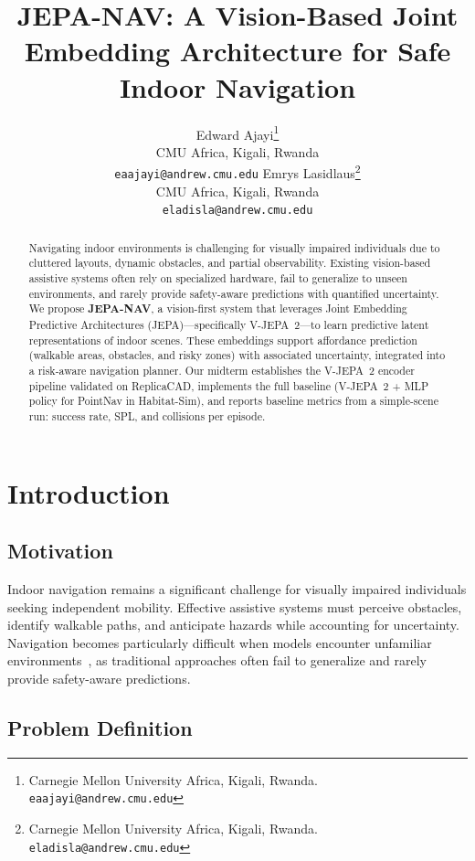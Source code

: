 \documentclass{article}
\title{JEPA-NAV: A Vision-Based Joint Embedding Architecture for Safe Indoor Navigation}
\author{
  Edward Ajayi\thanks{Carnegie Mellon University Africa, Kigali, Rwanda. \texttt{eaajayi@andrew.cmu.edu}} \\
  CMU Africa, Kigali, Rwanda \\
  \texttt{eaajayi@andrew.cmu.edu}
  \And
  Emrys Lasidlaus\thanks{Carnegie Mellon University Africa, Kigali, Rwanda. \texttt{eladisla@andrew.cmu.edu}} \\
  CMU Africa, Kigali, Rwanda \\
  \texttt{eladisla@andrew.cmu.edu}
}
\begin{document}
\maketitle

\begin{abstract}
Navigating indoor environments is challenging for visually impaired individuals due to
cluttered layouts, dynamic obstacles, and partial observability. Existing vision-based
assistive systems often rely on specialized hardware, fail to generalize to unseen
environments, and rarely provide safety-aware predictions with quantified uncertainty.
We propose \textbf{JEPA-NAV}, a vision-first system that leverages Joint Embedding
Predictive Architectures (JEPA)---specifically V-JEPA~2---to learn predictive latent
representations of indoor scenes. These embeddings support affordance prediction
(walkable areas, obstacles, and risky zones) with associated uncertainty, integrated
into a risk-aware navigation planner. Our midterm establishes the V-JEPA~2 encoder
pipeline validated on ReplicaCAD, implements the full baseline (V-JEPA~2 + MLP policy
for PointNav in Habitat-Sim), and reports baseline metrics from a simple-scene run:
success rate, SPL, and collisions per episode.
\end{abstract}

\section{Introduction}

\subsection{Motivation}

Indoor navigation remains a significant challenge for visually impaired individuals
seeking independent mobility. Effective assistive systems must perceive obstacles,
identify walkable paths, and anticipate hazards while accounting for uncertainty.
Navigation becomes particularly difficult when models encounter unfamiliar
environments~\cite{najjar2022dynamic}, as traditional approaches often fail to
generalize and rarely provide safety-aware predictions.

\subsection{Problem Definition}
\end{document}
